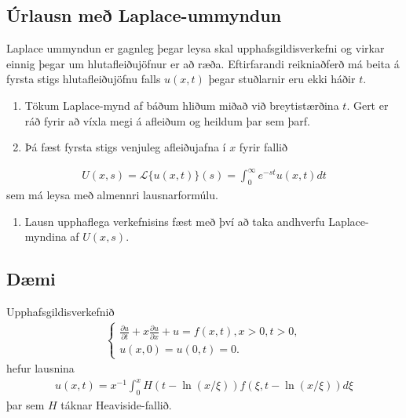 \documentclass[a4paper,10pt,icelandic]{sphinxmanual}
\begin{document}
\subsection{Úrlausn með Laplace-ummyndun}
\label{\detokenize{Kafli01:urlausn-me-laplace-ummyndun}}
Laplace ummyndun er gagnleg þegar leysa skal upphafsgildisverkefni og virkar einnig þegar um hlutafleiðujöfnur er að ræða. Eftirfarandi reikniaðferð má beita á fyrsta stigs hlutafleiðujöfnu falls \(u(x,t)\) þegar stuðlarnir eru ekki háðir \(t\).
\begin{enumerate}
\def\theenumi{\arabic{enumi}}
\def\labelenumi{\theenumi .}
\makeatletter\def\p@enumii{\p@enumi \theenumi .}\makeatother
\item {} 
Tökum Laplace-mynd af báðum hliðum miðað við breytistærðina \(t\). Gert er ráð fyrir að víxla megi á afleiðum og heildum þar sem þarf.

\item {} 
Þá fæst fyrsta stigs venjuleg afleiðujafna í \(x\) fyrir fallið

\end{enumerate}
\begin{equation*}
\begin{split}U(x,s) = \mathcal{L}\{u(x,t)\}(s) = \int_{0}^\infty e^{-st}u(x,t) dt\end{split}
\end{equation*}
sem má leysa með almennri lausnarformúlu.
\begin{enumerate}
\def\theenumi{\arabic{enumi}}
\def\labelenumi{\theenumi .}
\makeatletter\def\p@enumii{\p@enumi \theenumi .}\makeatother
\setcounter{enumi}{2}
\item {} 
Lausn upphaflega verkefnisins fæst með því að taka andhverfu Laplace-myndina af \(U(x,s)\).

\end{enumerate}


\subsection{Dæmi}
\label{\detokenize{Kafli01:daemi}}
Upphafsgildisverkefnið
\begin{equation*}
\begin{split}\left\{\begin {array}{l}
\frac{\partial u}{\partial t}+ x\frac{\partial u}{\partial x} + u = f(x,t), x>0, t>0, \\
u(x,0) = u(0,t) = 0.
\end{array}\right.\end{split}
\end{equation*}
hefur lausnina
\begin{equation*}
\begin{split}u(x,t) = x^{-1}\int_{0}^x H(t-\ln(x/\xi)) f(\xi,t-\ln(x/\xi)) d\xi\end{split}
\end{equation*}
þar sem \(H\) táknar Heaviside-fallið.
\end{document}
